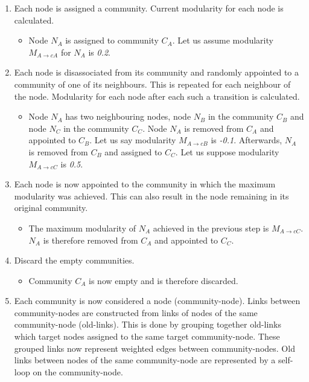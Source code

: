 \begin{enumerate} 
  \label{louvainAlgorithmPrinciple}
  \item  Each node is assigned a community. Current modularity for each node is calculated. 
  \label{LA1}
  \begin{itemize}
    \item Node $N_{A}$ is assigned to community $C_{A}$. Let us assume modularity $M_{A\rightarrow cA}$ for $N_{A}$ is \textit{0.2}.
  \end{itemize} 
  \item Each node is disassociated from its community and randomly appointed to a community of one of its neighbours. This is repeated for each neighbour of the node. Modularity for each node after each such a transition is calculated.
  \label{LA2}
  \begin{itemize}
    \item Node $N_{A}$ has two neighbouring nodes, node $N_{B}$ in the community $C_{B}$ and node $N_{C}$ in the community $C_{C}$. Node $N_{A}$ is removed from $C_{A}$ and appointed to $C_{B}$. Let us say modularity $M_{A\rightarrow cB}$ is \textit{-0.1}. Afterwards, $N_{A}$ is removed from $C_{B}$ and assigned to $C_{C}$. Let us suppose modularity $M_{A\rightarrow cC}$ is \textit{0.5}. 
  \end{itemize} 
  \item Each node is now appointed to the community in which the maximum modularity was achieved. This can also result in the node remaining in its original community.
  \label{LA3}
  \begin{itemize}
    \item The maximum modularity of $N_{A}$ achieved in the previous step is $M_{A\rightarrow cC}$. $N_{A}$ is therefore removed from $C_{A}$ and appointed to $C_{C}$.
  \end{itemize} 
  \item Discard the empty communities. 
  \label{LA4}
  \begin{itemize}
    \item Community $C_{A}$ is now empty and is therefore discarded.
  \end{itemize} 
  \item Each community is now considered a node (community-node). Links between community-nodes are constructed from links of nodes of the same community-node (old-links). This is done by grouping together old-links which target nodes assigned to the same target community-node. These grouped links now represent weighted edges between community-nodes. Old links between nodes of the same community-node are represented  by a self-loop on the community-node.

\end{enumerate}
